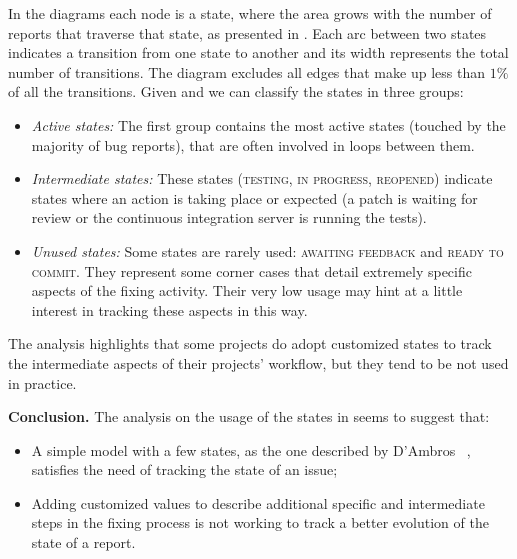 In the diagrams each node is a state, where the area grows with the number of reports that traverse that state, as presented in .
Each arc between two states indicates a transition from one state to another and its width represents the total number of transitions.
The diagram excludes all edges that make up less than $1\%$ of all the transitions.
Given  and  we can classify the states in three groups:

\begin{itemize}[$\circ$]

\item \textit{Active states:} The first group contains the most active states (\ie touched by the majority of bug reports), that are often involved in loops between them.

\item \textit{Intermediate states:} These states (\eg \textsc{testing}, \textsc{in progress}, \textsc{reopened}) indicate states where an action is taking place or expected (\eg a patch is waiting for review or the continuous integration server is running the tests).

\item \textit{Unused states:} Some states are rarely used: \textsc{awaiting feedback} and \textsc{ready to commit}.
They represent some corner cases that detail extremely specific aspects of the fixing activity.
Their very low usage may hint at a little interest in tracking these aspects in this way.

\end{itemize}

The analysis highlights that some projects do adopt customized states to track the intermediate aspects of their projects' workflow, but they tend to be not used in practice.

\textbf{Conclusion.} The analysis on the usage of the states in  seems to suggest that:
\begin{itemize}[$\circ$]
\item A simple model with a few states, as the one described by D'Ambros \etal~\cite{DAmb2007b}, satisfies the need of tracking the state of an issue;
\item Adding customized values to  describe additional specific and intermediate steps in the fixing process is not working to track a better evolution of the state of a report.
\end{itemize}

